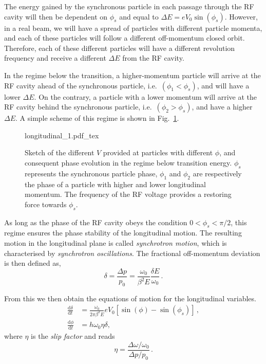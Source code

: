 The energy gained by the synchronous particle in each passage through the RF cavity will then be dependent on $\phi_s$ and equal to $\Delta E=e V_0 \sin \left(\phi_s\right)$. However, in a real beam, we will have a spread of particles with different particle momenta, and each of these particles will follow a different off-momentum closed orbit. Therefore, each of these different particles will have a different revolution frequency and receive a different $\Delta E$ from the RF cavity.

In the regime below the transition, a higher-momentum particle will arrive at the RF cavity ahead of the synchronous particle, i.e.\ $\left(\phi_1<\phi_s\right)$, and will have a lower $\Delta E$. On the contrary, a particle with a lower momentum will arrive at the RF cavity behind the synchronous particle, i.e.\ $\left(\phi_2>\phi_s\right)$, and have a higher $\Delta E$. A simple scheme of this regime is shown in Fig.~\ref{fig:long_1}.

\begin{figure}
    \centering
    \def\svgwidth{0.85\columnwidth}
    {longitudinal_1.pdf_tex}
    \caption{Sketch of the different $V$ provided at particles with different $\phi$, and consequent phase evolution in the regime below transition energy. $\phi_s$ represents the synchronous particle phase, $\phi_1$ and $\phi_2$ are respectively the phase of a particle with higher and lower longitudinal momentum. The frequency of the RF voltage provides a restoring force towards $\phi_s$.}
    \label{fig:long_1}
\end{figure}

As long as the phase of the RF cavity obeys the condition $0<\phi_s<\pi / 2$, this regime ensures the phase stability of the longitudinal motion. The resulting motion in the longitudinal plane is called \textit{synchrotron motion}, which is characterised by \textit{synchrotron oscillations}. The fractional off-momentum deviation is then defined as,
\begin{equation}
    \delta=\frac{\Delta p}{p_0}=\frac{\omega_0}{\beta^2 E} \frac{\delta E}{\omega_0} \,.
\end{equation}

From this we then obtain the equations of motion for the longitudinal variables.
\begin{equation}
    \begin{aligned}
    \frac{\mathrm{d} \delta}{\mathrm{d} t} &=\frac{\omega_0}{2 \pi \beta^2 E} e V_0\left[\sin (\phi)-\sin \left(\phi_s\right)\right] \,, \\
    \frac{\mathrm{d} \phi}{\mathrm{d} t} &=h \omega_0 \eta \delta,
    \end{aligned}
\end{equation}
where $\eta$ is the \textit{slip factor} and reads
\begin{equation}
    \eta=\frac{\Delta \omega / \omega_0}{\Delta p / p_0} \,.
\end{equation}

